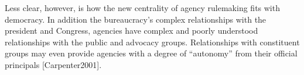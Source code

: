 Less clear, however, is how the new centrality of agency rulemaking fits with democracy. In addition the bureaucracy's complex relationships with the president and Congress, agencies have complex and poorly understood relationships with the public and advocacy groups. Relationships with constituent groups may even provide agencies with a degree of ``autonomy'' from their official principals [Carpenter2001]. %



